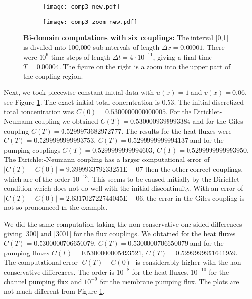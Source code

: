 %
\begin{figure}
%
\begin{subfigure}{.49\textwidth}
  \centering
  \texttt{[image: comp3\_new.pdf]}
  \caption{}
\end{subfigure}
%
\begin{subfigure}{.49\textwidth}
  \centering
  \texttt{[image: comp3\_zoom\_new.pdf]}
  \caption{}
\end{subfigure}
%
\caption{\textbf{Bi-domain computations with six couplings:} 
\label{comp3}
The interval [0,1] is divided into 100,000 sub-intervals of length $\Delta x=0.00001$. 
There were $10^6$ time steps of length $\Delta t=4\cdot 10^{-11}$, giving a final time $T=0.00004$. 
The figure on the right is a zoom into the upper part of the coupling region.}
%
\end{figure}

Next, we took piecewise constant initial data with $u(x)=1$ and $v(x)=0.06$, see Figure \ref{comp3}.
The exact initial total concentration is $0.53$. The initial discretized total 
concentration was $C(0)=0.5300000000000005$. 
For the Dirichlet-Neumann coupling we obtained $C(T)=0.5300009399993384$
and for the Giles coupling $C(T)=0.5299973682972777$. The results for 
the heat fluxes were $C(T)=0.5299999999993753$, $C(T)=0.5299999999994137$
and for the pumping couplings $C(T)=0.5299999999994603$, $C(T)=0.5299999999993950$.
The Dirichlet-Neumann coupling has a larger computational error of $|C(T)-C(0)|=9.399993379233251\text{E}-07$
then the other correct couplings, which are of the order $10^{-13}$. 
This seems to be caused initially by the Dirichlet condition
which does not do well with the initial discontinuity. With an error
of $|C(T)-C(0)|=2.631702722744045\text{E}-06$, the error in the Giles coupling is not
so pronounced in the example.

We did the same computation taking the non-conservative one-sided differences
giving \eqref{300} and \eqref{3001} for the flux couplings. We obtained for the heat fluxes
$C(T)=0.5300000706650079$, $C(T)=0.5300000706650079$ and for the pumping fluxes
$C(T)=0.5300000005493521$, $C(T)=0.5299999951641959$. The computational error
$|C(T)-C(0)|$ is considerably higher with the non-conservative differences. The order
is $10^{-8}$ for the heat fluxes, $10^{-10}$ for the channel pumping flux and
$10^{-9}$ for the membrane pumping flux. The plots are not much different from Figure \ref{comp3}.



